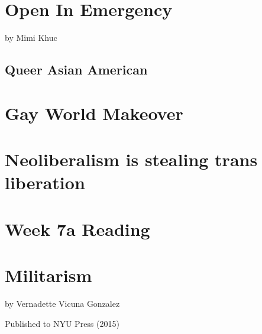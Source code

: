 \documentclass{article}
\begin{document}
  \section{Open In Emergency}
  by Mimi Khuc


  \subsection{Queer Asian American}


  \section{Gay World Makeover}
  \section{Neoliberalism is stealing trans liberation}


  \section*{Week 7a Reading}
  \section{Militarism}
  by Vernadette Vicuna Gonzalez

  Published to NYU Press (2015)
\end{document}
